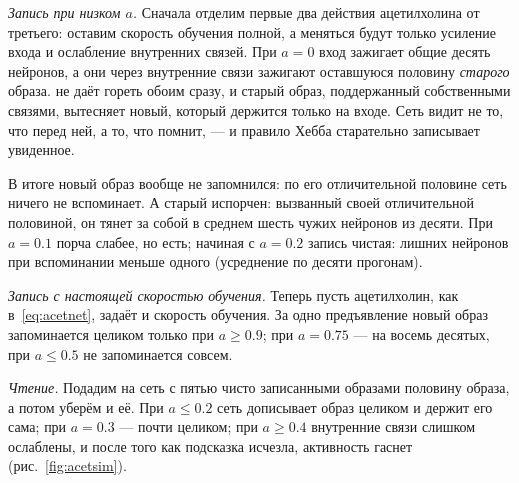 \emph{Запись при низком $a$.} Сначала отделим первые два действия ацетилхолина от третьего: оставим скорость обучения полной, а меняться будут только усиление входа и ослабление внутренних связей. При $a=0$ вход зажигает общие десять нейронов, а они через внутренние связи зажигают оставшуюся половину \emph{старого} образа.  не даёт гореть обоим сразу, и старый образ, поддержанный собственными связями, вытесняет новый, который держится только на входе. Сеть видит не то, что перед ней, а то, что помнит, --- и правило Хебба старательно записывает увиденное.

В итоге новый образ вообще не запомнился: по его отличительной половине сеть ничего не вспоминает. А старый испорчен: вызванный своей отличительной половиной, он тянет за собой в среднем шесть чужих нейронов из десяти. При $a=0.1$ порча слабее, но есть; начиная с $a=0.2$ запись чистая: лишних нейронов при вспоминании меньше одного (усреднение по десяти прогонам).

\emph{Запись с настоящей скоростью обучения.} Теперь пусть ацетилхолин, как в~\eqref{eq:acetnet}, задаёт и скорость обучения. За одно предъявление новый образ запоминается целиком только при $a\ge0.9$; при $a=0.75$ --- на восемь десятых, при $a\le0.5$ не запоминается совсем.

\emph{Чтение.} Подадим на сеть с пятью чисто записанными образами половину образа, а потом уберём и её. При $a\le0.2$ сеть дописывает образ целиком и держит его сама; при $a=0.3$ --- почти целиком; при $a\ge0.4$ внутренние связи слишком ослаблены, и после того как подсказка исчезла, активность гаснет (рис.~\ref{fig:acetsim}).

